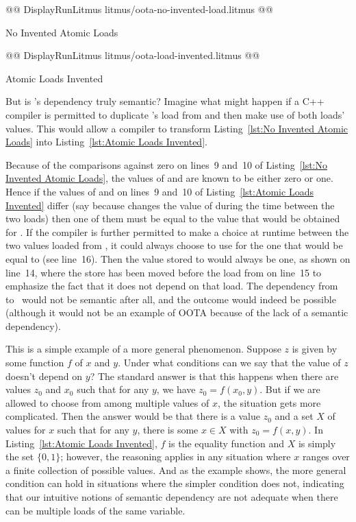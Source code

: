 \documentclass[10]{article}
\begin{document}
\begin{listing}[tbp]
@@ DisplayRunLitmus litmus/oota-no-invented-load.litmus @@
\caption{No Invented Atomic Loads}
\label{lst:No Invented Atomic Loads}
\end{listing}

\begin{listing}[tbp]
@@ DisplayRunLitmus litmus/oota-load-invented.litmus @@
\caption{Atomic Loads Invented}
\label{lst:Atomic Loads Invented}
\end{listing}

But is 's dependency truly semantic?
Imagine what might happen if a C++ compiler is permitted to
duplicate 's load from  and then make use of both loads'
values.
This would allow a compiler to transform
Listing~\ref{lst:No Invented Atomic Loads}
into
Listing~\ref{lst:Atomic Loads Invented}.

Because of the comparisons against zero on lines~9 and~10 of
Listing~\ref{lst:No Invented Atomic Loads},
the values of  and  are known to be either zero or one.
Hence if the values of  and  on lines~9 and~10 of
Listing~\ref{lst:Atomic Loads Invented}
differ (say because  changes the value of 
during the time between the two loads)
then one of them must be equal to the value that would
be obtained for .
If the compiler is further permitted to make a choice at runtime
between the two values loaded from , it could always choose
to use for  the one that would be equal to  (see line~16).
Then the value stored to  would always be one,
as shown on line~14, where the store has been moved before
the load from  on line~15 to emphasize the fact that
it does not depend on that load.
The dependency from~ to~ would not be semantic after all,
and the outcome  would indeed be possible
(although it would not be an example of OOTA because of the lack of a
semantic dependency).

This is a simple example of a more general phenomenon.
Suppose $z$ is given by some function $f$ of $x$ and $y$.
Under what conditions can we say that the value of $z$ doesn't depend
on $y$?
The standard answer is that this happens when there are values
$z_0$ and $x_0$ such that for any $y$, we have $z_0 = f(x_0, y)$.
But if we are allowed to choose from among multiple values of $x$,
the situation gets more complicated.
Then the answer would be that there is a value $z_0$ and
a set $X$ of values for $x$ such that for any $y$, there is some
$x \in X$ with $z_0 = f(x, y)$.
In Listing~\ref{lst:Atomic Loads Invented},
$f$ is the equality function and $X$ is simply the set $\{0, 1\}$;
however, the reasoning applies in any situation where $x$ ranges
over a finite collection of possible values.
And as the example shows, the more general condition can hold in situations
where the simpler condition does not, indicating that our intuitive
notions of semantic dependency are not adequate when there can be
multiple loads of the same variable.
\end{document}
